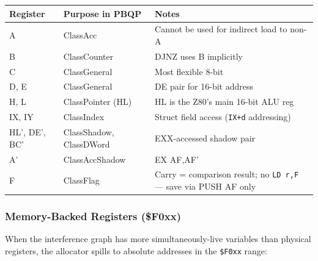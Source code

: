 \documentclass[
  11pt,
]{article}
\newenvironment{Shaded}{}{}
\newcommand{\CommentTok}[1]{\textcolor[rgb]{0.38,0.63,0.69}{\textit{#1}}}
\newcommand{\NormalTok}[1]{#1}
\newcommand{\OperatorTok}[1]{\textcolor[rgb]{0.40,0.40,0.40}{#1}}
\begin{document}
\begin{longtable}[]{@{}
  >{\raggedright\arraybackslash}p{}
  >{\raggedright\arraybackslash}p{}
  >{\raggedright\arraybackslash}p{}@{}}
\toprule\noalign{}
\begin{minipage}[b]{\linewidth}\raggedright
Register
\end{minipage} & \begin{minipage}[b]{\linewidth}\raggedright
Purpose in PBQP
\end{minipage} & \begin{minipage}[b]{\linewidth}\raggedright
Notes
\end{minipage} \\
\midrule\noalign{}
\endhead
\bottomrule\noalign{}
\endlastfoot
A & ClassAcc & Cannot be used for indirect load to non-A \\
B & ClassCounter & DJNZ uses B implicitly \\
C & ClassGeneral & Most flexible 8-bit \\
D, E & ClassGeneral & DE pair for 16-bit address \\
H, L & ClassPointer (HL) & HL is the Z80's main 16-bit ALU reg \\
IX, IY & ClassIndex & Struct field access (\texttt{IX+d} addressing) \\
HL', DE', BC' & ClassShadow, ClassDWord & EXX-accessed shadow pair \\
A' & ClassAccShadow & EX AF,AF' \\
F & ClassFlag & Carry = comparison result; no \texttt{LD\ r,F} --- save
via PUSH AF only \\
\end{longtable}

\subsubsection{Memory-Backed Registers
(\$F0xx)}\label{memory-backed-registers-f0xx}

When the interference graph has more simultaneously-live variables than
physical registers, the allocator spills to absolute addresses in the
\texttt{\$F0xx} range:

\begin{Shaded}
\end{Shaded}
\end{document}
